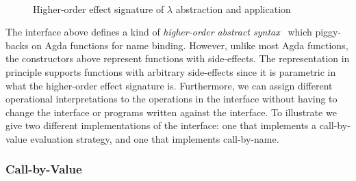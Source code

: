 \begin{figure}[t]
\begin{code}
\AgdaSymbol{\AgdaUnderscore{}\}}\AgdaSpace{}%
\AgdaSymbol{()}\<%
\\
%
\>[4]%
\>[11]%
\>[17]\AgdaSymbol{\{}\AgdaSpace{}%
\AgdaSymbol{\{}\AgdaSymbol{\}}\AgdaSpace{}%
\AgdaSymbol{\{}\AgdaSymbol{\}}\AgdaSpace{}%
\AgdaSymbol{\AgdaUnderscore{}\}}\AgdaSpace{}%
\AgdaSymbol{\AgdaUnderscore{}}%
\>[38]\AgdaSymbol{=}\AgdaSpace{}%
\AgdaSpace{}%
\AgdaSpace{}%
\<%
\end{code}
\caption{Higher-order effect signature of $\lambda$ abstraction and application}
\label{fig:ho-lam-sig}
\end{figure}

The interface above defines a kind of \emph{higher-order abstract syntax}~\citep{PfenningE88} which piggy-backs on Agda functions for name binding.
However, unlike most Agda functions, the constructors above represent functions with side-effects.
The representation in principle supports functions with arbitrary side-effects since it is parametric in what  the higher-order effect signature  is.
Furthermore, we can assign different operational interpretations to the operations in the interface without having to change the interface or programs written against the interface.
To illustrate we give two different implementations of the interface: one that implements a call-by-value evaluation strategy, and one that implements call-by-name.


\subsubsection{Call-by-Value}

